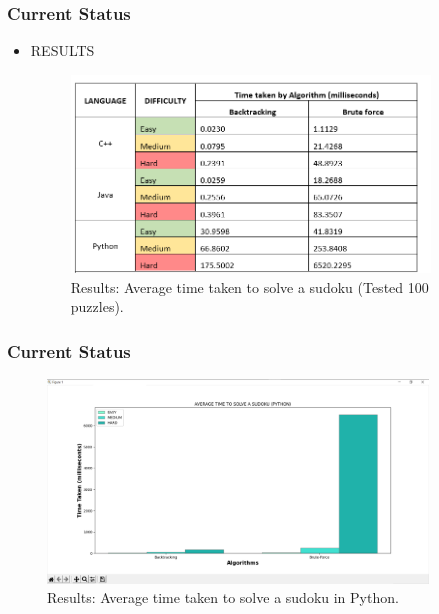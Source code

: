 \documentclass{beamer}
\begin{document}
\begin{frame}
     \frametitle{Current Status}   
     \begin{itemize}
		  \item RESULTS
		  \begin{figure}
		  \includegraphics[width=0.9\textwidth]{./week7_img/sudoku_result_table.png}
		  \caption{Results: Average time taken to solve a sudoku (Tested 100 puzzles).}
		  \centering
		  \end{figure}
	 \end{itemize}
\end{frame}

\begin{frame}
     \frametitle{Current Status}   
		  \begin{figure}
		  \includegraphics[width=0.9\textwidth]{./week7_img/graph_python.png}
		  \caption{Results: Average time taken to solve a sudoku in Python.}
		  \centering
		  \end{figure}
\end{frame}
\end{document}
